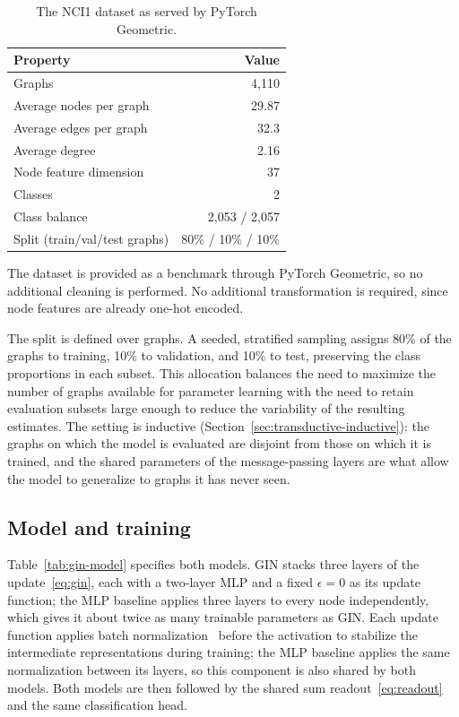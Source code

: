 \begin{table}
  \caption[NCI1 dataset.]{%
    The NCI1 dataset as served by PyTorch Geometric.
  }
  \label{tab:nci1-stats}
  \begin{center}
    \small
    \begin{tabular}{lr}
      \toprule
      Property & Value \\
      \midrule
      Graphs                        & 4{,}110 \\
      Average nodes per graph       & 29.87 \\
      Average edges per graph       & 32.3 \\
      Average degree                & 2.16 \\
      Node feature dimension        & 37 \\
      Classes                       & 2 \\
      Class balance                 & 2{,}053 / 2{,}057 \\
      Split (train/val/test graphs) & 80\% / 10\% / 10\% \\
      \bottomrule
    \end{tabular}
  \end{center}
\end{table}

The dataset is provided as a benchmark through PyTorch Geometric, so no
additional cleaning is performed. No additional transformation is required,
since node features are already one-hot encoded.

The split is defined over graphs. A seeded, stratified sampling assigns 80\%
of the graphs to training, 10\% to validation, and 10\% to test, preserving
the class proportions in each subset. This allocation balances the need to maximize
the number of graphs available for parameter learning with the need to retain
evaluation subsets large enough to reduce the variability of the resulting estimates.
The setting is inductive (Section~\ref{sec:transductive-inductive}): the graphs on
which the model is evaluated are disjoint from those on which it is trained,
and the shared parameters of the message-passing layers are what allow
the model to generalize to graphs it has never seen.

\subsection{Model and training}
\label{sec:gin-training}

Table~\ref{tab:gin-model} specifies both models. GIN stacks three layers of the
update~\eqref{eq:gin}, each with a two-layer MLP and a fixed $\epsilon = 0$ as its
update function; the MLP baseline applies three layers to every node independently,
which gives it about twice as many trainable parameters as GIN. Each update function
applies batch normalization~\cite{ioffe2015} before the activation to stabilize the
intermediate representations during training; the MLP baseline applies the same
normalization between its layers, so this component is also shared by both models.
Both models are then followed by the shared sum readout~\eqref{eq:readout} and the
same classification head.

